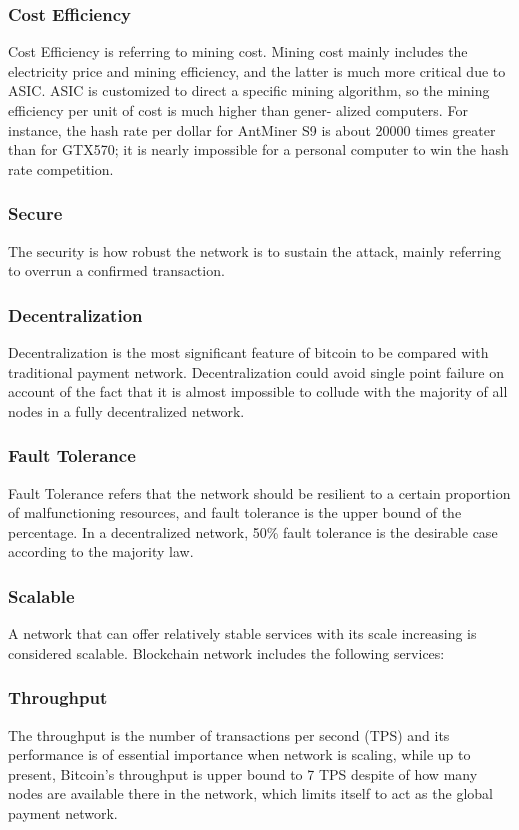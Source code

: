 \documentclass[a4paper,11pt]{article}
\begin{document}
\subsubsection*{Cost Efficiency}
Cost Efficiency is referring to mining cost. Mining cost mainly includes the electricity price and mining efficiency, and the latter is much more critical due to ASIC. ASIC is customized to direct a specific mining algorithm, so the mining efficiency per unit of cost is much higher than gener- alized computers. For instance, the hash rate per dollar for AntMiner S9 is about 20000 times greater than for GTX570; it is nearly impossible for a personal computer to win the hash rate competition.

\subsubsection{Secure}
The security is how robust the network is to sustain the attack, mainly referring to overrun a confirmed transaction.

\subsubsection*{Decentralization}
Decentralization is the most significant feature of bitcoin to be compared with traditional payment network. Decentralization could avoid single point failure on account of the fact that it is almost impossible to collude with the majority of all nodes in a fully decentralized network.
\subsubsection*{Fault Tolerance}
Fault Tolerance refers that the network should be resilient to a certain proportion of malfunctioning resources, and fault tolerance is the upper bound of the percentage. In a decentralized network, 50\% fault tolerance is the desirable case according to the majority law.

\subsubsection{Scalable}
A network that can offer relatively stable services with its scale increasing is considered scalable. Blockchain network includes the following services:
\subsubsection*{Throughput}
The throughput is the number of transactions per second (TPS) and its performance is of essential importance when network is scaling, while up to present, Bitcoin’s throughput is upper bound to 7 TPS despite of  how many nodes are available there in the network, which limits itself to act as the global payment network.
\end{document}
